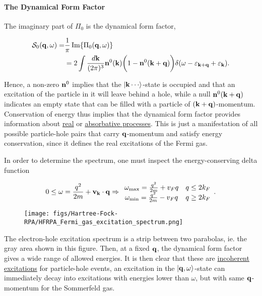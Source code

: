 \paragraph{The Dynamical Form Factor}

The imaginary part of $\Pi_0$ is the dynamical form factor,

\begin{equation}
    \begin{split}
        \mathcal{S}_{0}({\bf q}, \omega) =& \frac{1}{\pi} \Im{\Pi_0({\bf q}, \omega)} \\
        &= 2 \int \frac{d{\bf k}}{(2\pi)^3} {\bf n}^{0}({\bf k}) \bigg(1-{\bf n}^{0}({\bf k+q})\bigg) \delta(\omega - \varepsilon_{{\bf k+q}} + \varepsilon_{{\bf k}}).
    \end{split}
\end{equation}

Hence, a non-zero ${\bf n}^{0}$ implies that the $\ket{{\bf k} \cdots}$-state is occupied and that an excitation of the particle in it will leave behind a hole, while a null ${\bf n}^{0}({\bf k+q})$ indicates an empty state that can be filled with a particle of $({\bf k+q})$-momentum. Conservation of energy thus implies that the dynamical form factor provides information about \underline{real} or \underline{absorbative processes}. This is just a manifestation of all possible particle-hole pairs that carry ${\bf q}$-momentum and satisfy energy conservation, since it defines the real excitations of the Fermi gas.

In order to determine the spectrum, one must inspect the energy-conserving delta function

\begin{equation}
    0 \leq \omega = \frac{q^2}{2m} + {\bf v_k} \cdot {\bf q} \Rightarrow \begin{array}{cc}
         \omega_{\textnormal{max}} = \frac{q^2}{2m} + v_F q & q \leq 2k_F \\
         \omega_{\textnormal{min}} = \frac{q^2}{2m} - v_F q & q \geq 2k_F
    \end{array}.
\end{equation}

\begin{wrapfigure}{l}{0.2\textwidth}
\texttt{[image: figs/Hartree-Fock-RPA/HFRPA\_Fermi\_gas\_excitation\_spectrum.png]}
\end{wrapfigure}  

The electron-hole excitation spectrum is a strip between two parabolas, ie. the gray area shown in this figure. Then, at a fixed ${\bf q}$, the dynamical form factor gives a wide range of allowed energies. It is then clear that these are \underline{incoherent excitations} for particle-hole events, an excitation in the $\ket{{\bf q}, \omega}$-state can immediately decay into excitations with energies lower than $\omega$, but with same ${\bf q}$-momentum for the Sommerfeld gas. 

